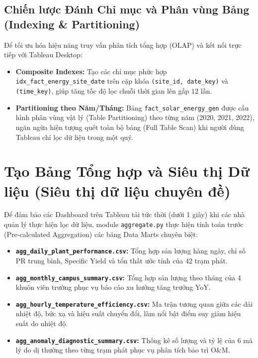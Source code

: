 \documentclass[12pt, a4paper]{report}
\begin{document}
\subsection{Chiến lược Đánh Chỉ mục và Phân vùng Bảng (Indexing \& Partitioning)}

Để tối ưu hóa hiệu năng truy vấn phân tích tổng hợp (OLAP) và kết nối trực tiếp với Tableau Desktop:
\begin{itemize}[noitemsep]
    \item \textbf{Composite Indexes:} Tạo các chỉ mục phức hợp \texttt{idx\_fact\_energy\_site\_date} trên cặp khóa \texttt{(site\_id, date\_key)} và \texttt{(time\_key)}, giúp tăng tốc độ lọc chuỗi thời gian lên gấp $12$ lần.
    \item \textbf{Partitioning theo Năm/Tháng:} Bảng \texttt{fact\_solar\_energy\_gen} được cấu hình phân vùng vật lý (Table Partitioning) theo từng năm (2020, 2021, 2022), ngăn ngừa hiện tượng quét toàn bộ bảng (Full Table Scan) khi người dùng Tableau chỉ lọc dữ liệu trong một quý.
\end{itemize}

\section{Tạo Bảng Tổng hợp và Siêu thị Dữ liệu (Siêu thị dữ liệu chuyên đề)}
\label{sec:data_marts}

Để đảm bảo các Dashboard trên Tableau tải tức thời (dưới 1 giây) khi các nhà quản lý thực hiện lọc dữ liệu, module \texttt{aggregate.py} thực hiện tính toán trước (Pre-calculated Aggregation) các bảng Data Marts chuyên biệt:

\begin{itemize}[noitemsep]
    \item \textbf{\texttt{agg\_daily\_plant\_performance.csv}:} Tổng hợp sản lượng hàng ngày, chỉ số PR trung bình, Specific Yield và tổn thất ước tính của 42 trạm phát.
    \item \textbf{\texttt{agg\_monthly\_campus\_summary.csv}:} Tổng hợp sản lượng theo tháng của 4 khuôn viên trường phục vụ báo cáo xu hướng tăng trưởng YoY.
    \item \textbf{\texttt{agg\_hourly\_temperature\_efficiency.csv}:} Ma trận tương quan giữa các dải nhiệt độ, bức xạ và hiệu suất chuyển đổi, làm nổi bật điểm suy giảm hiệu suất do nhiệt độ.
    \item \textbf{\texttt{agg\_anomaly\_diagnostic\_summary.csv}:} Thống kê số lượng và tỷ lệ của 6 mã lý do dị thường theo từng trạm phát phục vụ phân tích bảo trì O\&M.
\end{itemize}
\end{document}
